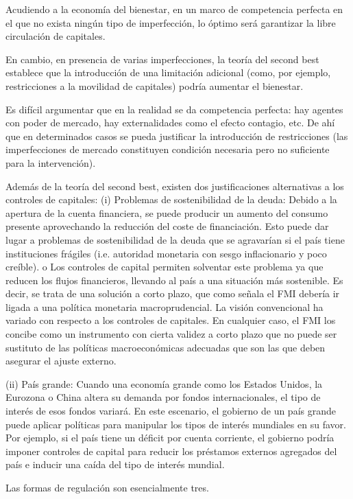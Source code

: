 \documentclass[10pt,a4paper]{article}
\begin{document}
Acudiendo a la economía del bienestar, en un marco de competencia perfecta en el que no exista ningún tipo de imperfección, lo óptimo será garantizar la libre circulación de capitales. 

En cambio, en presencia de varias imperfecciones, la teoría del second best establece que la introducción de una limitación adicional (como, por ejemplo, restricciones a la movilidad de capitales) podría aumentar el bienestar. 

Es difícil argumentar que en la realidad se da competencia perfecta: hay agentes con poder de mercado, hay externalidades como el efecto contagio, etc. De ahí que en determinados casos se pueda justificar la introducción de restricciones (las imperfecciones de mercado constituyen condición necesaria pero no suficiente para la intervención). 

Además de la teoría del second best, existen dos justificaciones alternativas a los controles de capitales: 
(i) Problemas de sostenibilidad de la deuda:
Debido a la apertura de la cuenta financiera, se puede producir un aumento del consumo presente aprovechando la reducción del coste de financiación. Esto puede dar lugar a problemas de sostenibilidad de la deuda que se agravarían si el país tiene instituciones frágiles (i.e. autoridad monetaria con sesgo inflacionario y poco creíble). o Los controles de capital permiten solventar este problema ya que reducen los flujos financieros, llevando al país a una situación más sostenible. 
Es decir, se trata de una solución a corto plazo, que como señala el FMI debería ir ligada a una política monetaria macroprudencial. 
La visión convencional ha variado con respecto a los controles de capitales. En cualquier caso, el FMI los concibe como un instrumento con cierta validez a corto plazo que no puede ser sustituto de las políticas macroeconómicas adecuadas que son las que deben asegurar el ajuste externo. 

(ii) País grande: 
Cuando una economía grande como los Estados Unidos, la Eurozona o China altera su demanda por fondos internacionales, el tipo de interés de esos fondos variará. En este escenario, el gobierno de un país grande puede aplicar políticas para manipular los tipos de interés mundiales en su favor. Por ejemplo, si el país tiene un déficit por cuenta corriente, el gobierno podría imponer controles de capital para reducir los préstamos externos agregados del país e inducir una caída del tipo de interés mundial. 


Las formas de regulación son esencialmente tres.
\end{document}
